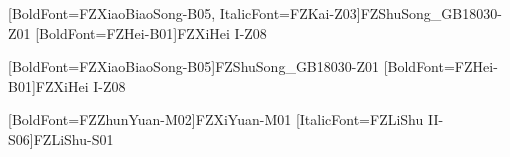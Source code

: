 \usepackage[BoldFont,SlantFont,CJKnumber]{xeCJK}
\usepackage{CJKfntef}


[BoldFont={FZXiaoBiaoSong-B05}, ItalicFont={FZKai-Z03}]{FZShuSong_GB18030-Z01} %
[BoldFont={FZHei-B01}]{FZXiHei I-Z08} %

[BoldFont={FZXiaoBiaoSong-B05}]{FZShuSong_GB18030-Z01} %
[BoldFont={FZHei-B01}]{FZXiHei I-Z08} %

[BoldFont={FZZhunYuan-M02}]{FZXiYuan-M01} %
[ItalicFont={FZLiShu II-S06}]{FZLiShu-S01} %

\def\heiti{\CJKfamily{hei}\bfseries}

